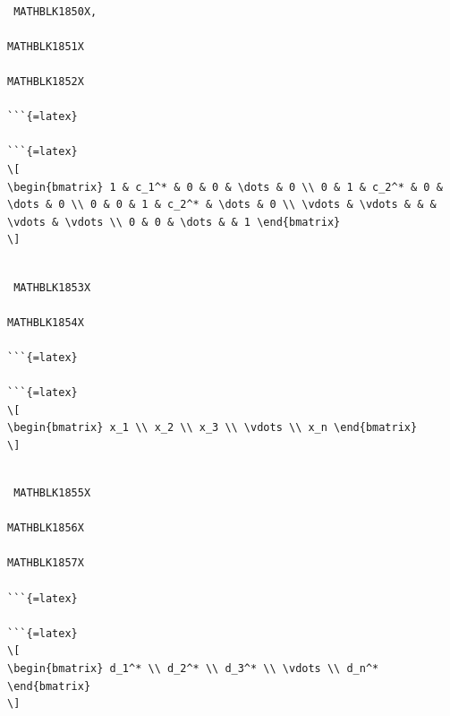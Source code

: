 \documentclass[
  ukrainian,
]{article}
\begin{document}
\begin{verbatim}

 MATHBLK1850X,

MATHBLK1851X

MATHBLK1852X

```{=latex}

```{=latex}
\[
\begin{bmatrix} 1 & c_1^* & 0 & 0 & \dots & 0 \\ 0 & 1 & c_2^* & 0 & \dots & 0 \\ 0 & 0 & 1 & c_2^* & \dots & 0 \\ \vdots & \vdots & & & \vdots & \vdots \\ 0 & 0 & \dots & & 1 \end{bmatrix}
\]
\end{verbatim}

\begin{verbatim}

 MATHBLK1853X

MATHBLK1854X

```{=latex}

```{=latex}
\[
\begin{bmatrix} x_1 \\ x_2 \\ x_3 \\ \vdots \\ x_n \end{bmatrix}
\]
\end{verbatim}

\begin{verbatim}

 MATHBLK1855X

MATHBLK1856X

MATHBLK1857X

```{=latex}

```{=latex}
\[
\begin{bmatrix} d_1^* \\ d_2^* \\ d_3^* \\ \vdots \\ d_n^* \end{bmatrix}
\]
\end{verbatim}
\end{document}
